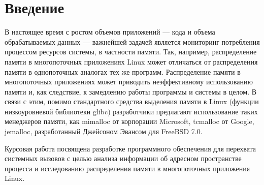\chapter*{Введение}

В настоящее время с ростом объемов приложений --- кода и объема обрабатываемых данных --- важнейшей задачей является мониторинг потребления процессом ресурсов системы, в частности памяти. Так, например, распределение памяти в многопоточных приложениях Linux может отличаться от распределения памяти в однопоточных аналогах тех же программ. Распределение памяти в многопоточных приложениях может приводить неэффективному использованию памяти и, как следствие, к замедлению работы программы и системы в целом. В связи с этим, помимо стандартного средства выделения памяти в Linux (функции  низкоуровневой библиотеки glibc) разработчики предлагают использование таких менеджеров памяти, как mimalloc от корпорации Microsoft, tcmalloc от Google, jemalloc, разработанный Джейсоном Эвансом для FreeBSD 7.0.

Курсовая работа посвящена разработке программного обеспечения для перехвата системных вызовов с целью анализа информации об адресном пространстве процесса и исследованию распределения памяти в многопоточных приложения Linux.